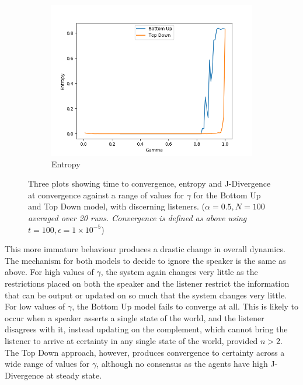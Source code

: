 \begin{figure}[H]
\begin{subfigure}[ht]{0.45\textwidth}
    \includegraphics[width=\textwidth]{Images/Figures/All/Entropy_Spite_ALL_n_3_p_100_gamma_100_runs_20.png}
    \caption{Entropy}
 \end{subfigure}

 \caption{Three plots showing time to convergence, entropy and J-Divergence at convergence against a range of values for $\gamma$ for the Bottom Up and Top Down model, with discerning listeners. (\textit{$\alpha = 0.5, N = 100$ averaged over 20 runs. Convergence is defined as above using $t=100, \epsilon = 1\times10^{-5}$})}\label{fig:convergence_FIE}
\end{figure}

This more immature behaviour produces a drastic change in overall dynamics. The mechanism for both models to decide to ignore the speaker is the same as above. For high values of $\gamma$, the system again changes very little as the restrictions placed on both the speaker and the listener restrict the information that can be output or updated on so much that the system changes very little. For low values of $\gamma$, the Bottom Up model fails to converge at all. This is likely to occur when a speaker asserts a single state of the world, and the listener disagrees with it, instead updating on the complement, which cannot bring the listener to arrive at certainty in any single state of the world, provided $n>2$. The Top Down approach, however, produces convergence to certainty across a wide range of values for $\gamma$, although no consensus as the agents have high J-Divergence at steady state. 


